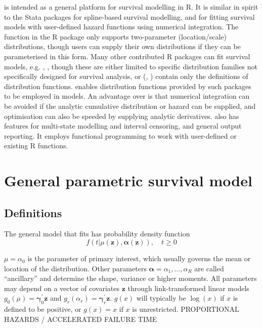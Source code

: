 \documentclass[nojss,nofooter]{jss}\usepackage[]{graphicx}\usepackage[]{color}
\begin{document}
 is intended as a general platform for survival
modelling in R.  It is similar in spirit to the Stata packages
 \citep{stpm2} for spline-based survival modelling, and
 \citep{stgenreg} for fitting survival models with
user-defined hazard functions using numerical integration. The
 function in the R package  only supports
two-parameter (location/scale) distributions, though users can supply
their own distributions if they can be parameterised in this form.
Many other contributed R packages can fit survival models,
e.g.  \citep{eha},  \citep{yee:wild}, though these
are either limited to specific distribution families not specifically
designed for survival analysis, or (,
\citet{ActuDistns}) contain only the definitions of distribution
functions.   enables distribution functions provided by
such packages to be employed in models.  An advantage over
 is that numerical integration can be avoided if the
analytic cumulative distribution or hazard can be supplied, and
optimisation can also be speeded by supplying analytic derivatives.
 also has features for multi-state modelling and
interval censoring, and general output reporting.  It employs
functional programming to work with user-defined or existing R
functions.



\section{General parametric survival model}

\subsection{Definitions} 

The general model that  fits has probability density function
\begin{equation}
  \label{eq:model}
  f(t | \mu(\mathbf{z}), \bm{\alpha}(\mathbf{z})), \quad t \geq 0  
\end{equation}

$\mu=\alpha_0$ is the parameter of primary interest,
which usually governs the mean or location of the distribution.  Other
parameters $\bm{\alpha} = \alpha_1, \ldots, \alpha_R$ are called
``ancillary'' and determine the shape, variance or higher moments.
All parameters may depend on a vector of covariates $\mathbf{z}$
through link-transformed linear models $g_0(\mu) = \bm{\gamma}_0^{'}
\mathbf{z}$ and $g_r(\alpha_r) = \bm{\gamma}_r^{'} \mathbf{z}$. $g(x)$ will
typically be $\log(x)$ if $x$ is defined to be positive, or $g(x)=x$
if $x$ is unrestricted.
PROPORTIONAL HAZARDS / ACCELERATED FAILURE TIME
\end{document}
